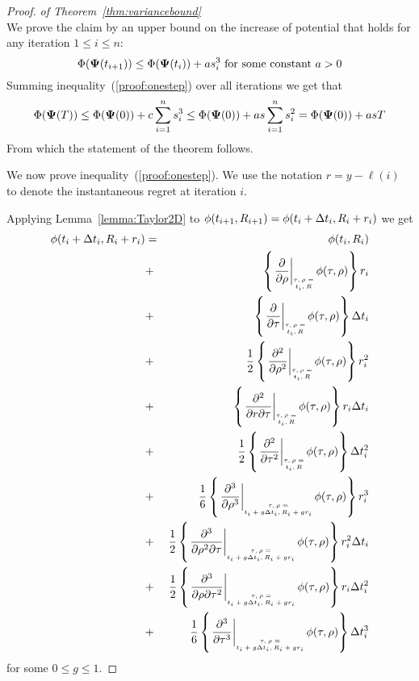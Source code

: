 \documentclass[anon,12pt]{colt2024} %
\begin{document}
\begin{proof} {\em of Theorem~\ref{thm:variancebound}}\\
We prove the claim by an upper bound on the increase of potential that holds for any iteration $1 \leq i \leq n$:
\begin{equation} \label{proof:onestep}
\Phi({\bf \Psi}(t_{i+1})) \leq \Phi({\bf \Psi}(t_i)) + a s_i^3 \mbox{ for some constant } a>0
\end{equation}
Summing inequality~(\ref{proof:onestep}) over all iterations we get that 
\begin{equation} \label{proof:allsteps}
\Phi({\bf \Psi}(T)) \leq \Phi({\bf \Psi}(0)) + c \sum_{i=1}^n s_i^3 \leq 
\Phi({\bf \Psi}(0)) + a s \sum_{i=1}^n s_i^2 = 
\Phi({\bf \Psi}(0)) + a s T
\end{equation}
From which the statement of the theorem follows.

We now prove inequality~(\ref{proof:onestep}). 
We use the notation $r=y -\ell(i)$ to denote the instantaneous regret at iteration $i$. 


Applying Lemma~\ref{lemma:Taylor2D} to
$\phi(t_{i+1},R_{i+1})=\phi(t_i+\Delta t_i,R_i+r_i)$  we get
\begin{eqnarray} 
    \pot(t_i+\deltat_i,\R_i+r_i) & =&  
    \pot(t_i,\R_i)\\
    &+&\at{\frac{\partial}{\partial \rho}} r_i \\
    &+&\at{\frac{\partial}{\partial \tau}}  \deltat_i \\
    &+& \frac{1}{2} \at{\frac{\partial^2}{\partial \rho^2}} r_i^2 \\
    &+& \at{\frac{\partial^2}{\partial r \partial \tau}} r_i \deltat_i \label{term:Taylor_rdt}\\
    &+& \frac{1}{2} \at{\frac{\partial^2}{\partial \tau^2}} \deltat_i^2 \label{term:Taylor_dtsquare}\\
    &+& \frac{1}{6} \att{\frac{\partial^3}{\partial \rho^3}} r_i^3 \label{term:Taylor_r3}\\
    &+& \frac{1}{2} \att{\frac{\partial^3}{\partial \rho^2 \partial \tau}} r_i^2\deltat_i \label{term:Taylor_r2t}\\
    &+& \frac{1}{2} \att{\frac{\partial^3}{\partial \rho \partial \tau^2}} r_i\deltat_i^2 \label{term:Taylor_rt2}\\
    &+& \frac{1}{6} \att{\frac{\partial^3}{\partial \tau^3}} \deltat_i^3 \label{term:Taylor_t3}
\end{eqnarray}
for some $0 \leq g \leq 1$.


\end{proof}
\end{document}
